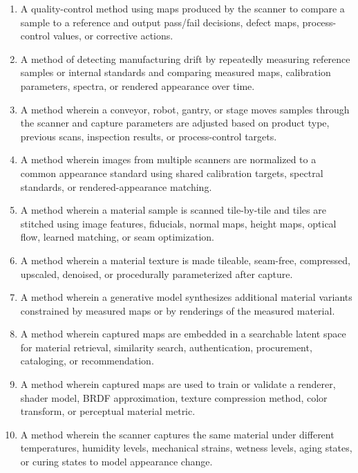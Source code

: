 \documentclass[11pt, twoside, listof=totocnumbered, bibliography=totocnumbered]{scrartcl}
\begin{document}
\begin{enumerate}
		\item A quality-control method using maps produced by the scanner to compare a sample to a reference and output pass/fail decisions, defect maps, process-control values, or corrective actions.
		
		\item A method of detecting manufacturing drift by repeatedly measuring reference samples or internal standards and comparing measured maps, calibration parameters, spectra, or rendered appearance over time.
		
		\item A method wherein a conveyor, robot, gantry, or stage moves samples through the scanner and capture parameters are adjusted based on product type, previous scans, inspection results, or process-control targets.
		
		\item A method wherein images from multiple scanners are normalized to a common appearance standard using shared calibration targets, spectral standards, or rendered-appearance matching.
		
		\item A method wherein a material sample is scanned tile-by-tile and tiles are stitched using image features, fiducials, normal maps, height maps, optical flow, learned matching, or seam optimization.
		
		\item A method wherein a material texture is made tileable, seam-free, compressed, upscaled, denoised, or procedurally parameterized after capture.
		
		\item A method wherein a generative model synthesizes additional material variants constrained by measured maps or by renderings of the measured material.
		
		\item A method wherein captured maps are embedded in a searchable latent space for material retrieval, similarity search, authentication, procurement, cataloging, or recommendation.
		
		\item A method wherein captured maps are used to train or validate a renderer, shader model, BRDF approximation, texture compression method, color transform, or perceptual material metric.
		
		\item A method wherein the scanner captures the same material under different temperatures, humidity levels, mechanical strains, wetness levels, aging states, or curing states to model appearance change.
		

\end{enumerate}
\end{document}
